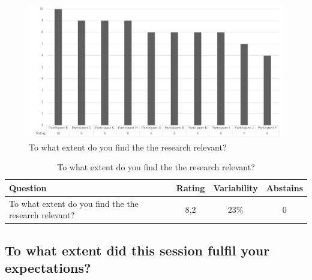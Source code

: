 \begin{figure}[H]
	\centering
	\includegraphics[width=0.9\linewidth]{images/validationresult_generalresearchrelevance}
	\caption[To what extent do you find the the research relevant?]{To what extent do you find the the research relevant?}
	\label{fig:validationrelevancegeneric}
\end{figure}
\begin{table}[H]
	\centering
	\begin{tabular}{p{}ccc}
		\toprule
		\textbf{Question} & \textbf{Rating} & \textbf{Variability} & \textbf{Abstains} \\
		\midrule
		To what extent do you find the the research relevant? & 8,2 & 23\% & 0 \\%
		\bottomrule
	\end{tabular}%
	\caption[To what extent do you find the the research relevant?]{To what extent do you find the the research relevant?}
	\label{tab:validationrelevancegeneric}%
\end{table}%



\subsection{To what extent did this session fulfil your expectations?}
\label{sub:fulfilexpectations}

